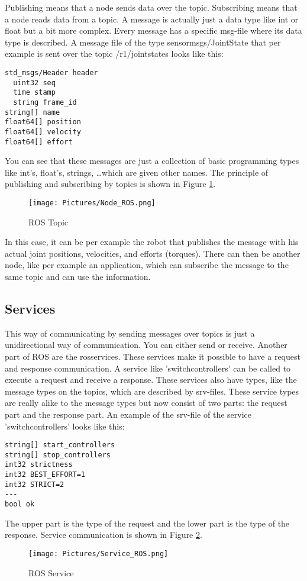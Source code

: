 \documentclass[11pt,a4paper]{report}
\begin{document}
Publishing means that a node sends data over the topic. Subscribing means that a node reads data from a topic. A message is actually just a data type like int or float but a bit more complex. Every message has a specific msg-file where its data type is described. A message file of the type sensor\textunderscore msgs/JointState that per example is sent over the topic /r1/joint\textunderscore states looks like this:
\begin{verbatim}
std_msgs/Header header
  uint32 seq
  time stamp
  string frame_id
string[] name
float64[] position
float64[] velocity
float64[] effort
\end{verbatim}
You can see that these messages are just a collection of basic programming types like int's, float's, strings, \ldots which are given other names. The principle of publishing and subscribing by topics is shown in Figure \ref{fig:NodeROS}.
\begin{figure}[!ht]
	\centering
	\texttt{[image: Pictures/Node\_ROS.png]}
	\caption{ROS Topic}
	\label{fig:NodeROS}
\end{figure}
In this case, it can be per example the robot that publishes the message with his actual joint positions, velocities, and efforts (torques). There can then be another node, like per example an application, which can subscribe the message to the same topic and can use the information.

\subsection{Services}\label{Services}
This way of communicating by sending messages over topics is just a unidirectional way of communication. You can either send or receive. Another part of ROS are the rosservices. These services make it possible to have a request and response communication. A service like 'switch\textunderscore controllers' can be called to execute a request and receive a response. These services also have types, like the message types on the topics, which are described by srv-files. These service types are really alike to the message types but now consist of two parts: the request part and the response part. An example of the srv-file of the service 'switch\textunderscore controllers' looks like this:
\begin{verbatim}
string[] start_controllers
string[] stop_controllers
int32 strictness
int32 BEST_EFFORT=1
int32 STRICT=2
---
bool ok
\end{verbatim}
The upper part is the type of the request and the lower part is the type of the response. Service communication is shown in Figure \ref{fig:ROSService}.
\begin{figure}[!ht]
	\centering
	\texttt{[image: Pictures/Service\_ROS.png]}
	\caption{ROS Service}
	\label{fig:ROSService}
\end{figure}
\newpage
\end{document}
